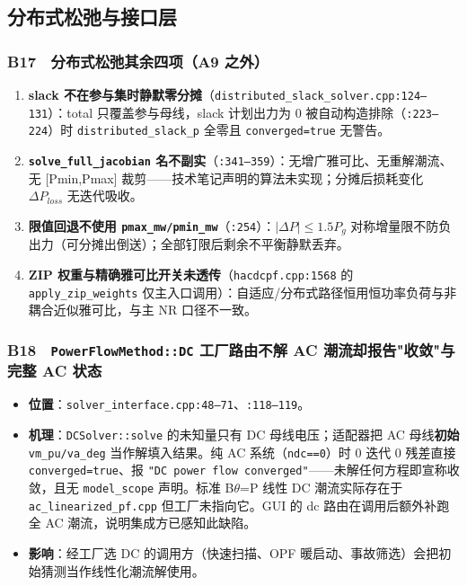 \documentclass[11pt,a4paper,fontset=fandol]{ctexart}
\newcommand{\file}[1]{\texttt{#1}}
\begin{document}
\subsection{分布式松弛与接口层}

\subsubsection*{B17　分布式松弛其余四项（A9 之外）}
\begin{enumerate}
  \item \textbf{slack 不在参与集时静默零分摊}（\file{distributed\_slack\_solver.cpp:124--131}）：total 只覆盖参与母线，slack 计划出力为 0 被自动构造排除（\file{:223--224}）时 \texttt{distributed\_slack\_p} 全零且 \texttt{converged=true} 无警告。
  \item \textbf{\texttt{solve\_full\_jacobian} 名不副实}（\file{:341--359}）：无增广雅可比、无重解潮流、无 [Pmin,Pmax] 裁剪——技术笔记声明的算法未实现；分摊后损耗变化 $\Delta P_{loss}$ 无迭代吸收。
  \item \textbf{限值回退不使用 \texttt{pmax\_mw/pmin\_mw}}（\file{:254}）：$|\Delta P|\le 1.5 P_g$ 对称增量限不防负出力（可分摊出倒送）；全部钉限后剩余不平衡静默丢弃。
  \item \textbf{ZIP 权重与精确雅可比开关未透传}（\file{hacdcpf.cpp:1568} 的 \file{apply\_zip\_weights} 仅主入口调用）：自适应/分布式路径恒用恒功率负荷与非耦合近似雅可比，与主 NR 口径不一致。
\end{enumerate}

\subsubsection*{B18　\texttt{PowerFlowMethod::DC} 工厂路由不解 AC 潮流却报告"收敛"与完整 AC 状态}
\begin{itemize}
  \item \textbf{位置}：\file{solver\_interface.cpp:48--71}、\file{:118--119}。
  \item \textbf{机理}：\file{DCSolver::solve} 的未知量只有 DC 母线电压；适配器把 AC 母线\textbf{初始} \texttt{vm\_pu/va\_deg} 当作解填入结果。纯 AC 系统（\texttt{ndc==0}）时 0 迭代 0 残差直接 \texttt{converged=true}、报 \texttt{"DC power flow converged"}——未解任何方程即宣称收敛，且无 \texttt{model\_scope} 声明。标准 B$\theta$=P 线性 DC 潮流实际存在于 \file{ac\_linearized\_pf.cpp} 但工厂未指向它。GUI 的 dc 路由在调用后额外补跑全 AC 潮流，说明集成方已感知此缺陷。
  \item \textbf{影响}：经工厂选 DC 的调用方（快速扫描、OPF 暖启动、事故筛选）会把初始猜测当作线性化潮流解使用。
\end{itemize}
\end{document}
